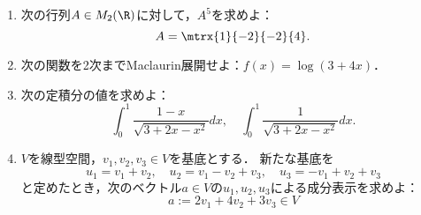 \documentclass[uplatex,dvipdfmx]{jsarticle}
\begin{document}
\begin{tcolorbox}[colframe=ForestGreen, colback=ForestGreen!10!white,breakable,colbacktitle=ForestGreen!40!white,coltitle=black,fonttitle=\bfseries\sffamily,
    title=第１問]
    \begin{problem}\mbox{}
        \begin{enumerate}
            \item 次の行列$A\in M_2(\R)$に対して，$A^5$を求めよ：
            \[A=\mtrx{1}{-2}{-2}{4}.\]
            \item 次の関数を2次までMaclaurin展開せよ：$f(x)=\log(3+4x)$．
            \item 次の定積分の値を求めよ：
            \[\int^1_0\frac{1-x}{\sqrt{3+2x-x^2}}dx,\quad\int^1_0\frac{1}{\sqrt{3+2x-x^2}}dx.\]
            \item $V$を線型空間，$v_1,v_2,v_3\in V$を基底とする．
            新たな基底を
            \[u_1=v_1+v_2,\quad u_2=v_1-v_2+v_3,\quad u_3=-v_1+v_2+v_3\]
            と定めたとき，次のベクトル$a\in V$の$u_1,u_2,u_3$による成分表示を求めよ：
            \[a:=2v_1+4v_2+3v_3\in V\]
        \end{enumerate}
    \end{problem}
\end{tcolorbox}
\end{document}
